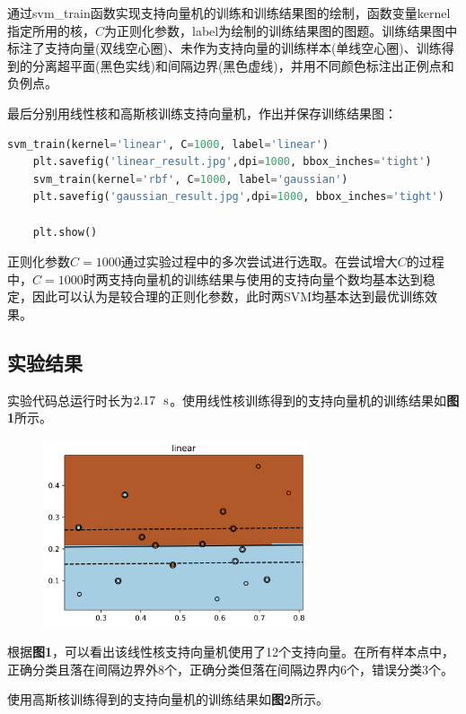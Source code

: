 \documentclass[12pt]{article}
\begin{document}
通过svm\_train函数实现支持向量机的训练和训练结果图的绘制，函数变量kernel指定所用的核，$C$为正则化参数，label为绘制的训练结果图的图题。训练结果图中标注了支持向量(双线空心圈)、未作为支持向量的训练样本(单线空心圈)、训练得到的分离超平面(黑色实线)和间隔边界(黑色虚线)，并用不同颜色标注出正例点和负例点。\par 
最后分别用线性核和高斯核训练支持向量机，作出并保存训练结果图：
\begin{lstlisting}[language=python]
	svm_train(kernel='linear', C=1000, label='linear')
	plt.savefig('linear_result.jpg',dpi=1000, bbox_inches='tight')
	svm_train(kernel='rbf', C=1000, label='gaussian')
	plt.savefig('gaussian_result.jpg',dpi=1000, bbox_inches='tight')
	
	plt.show()
\end{lstlisting}
正则化参数$C=1000$通过实验过程中的多次尝试进行选取。在尝试增大$C$的过程中，$C=1000$时两支持向量机的训练结果与使用的支持向量个数均基本达到稳定，因此可以认为是较合理的正则化参数，此时两SVM均基本达到最优训练效果。
\vbox{}

\subsection{实验结果}
实验代码总运行时长为$2.17\ \ {\rm s}$。使用线性核训练得到的支持向量机的训练结果如\textbf{图1}所示。
\begin{figure}[h]
	\centering
	\includegraphics[width=0.7\textwidth]{linear_result.jpg}
\end{figure}
\par 
根据\textbf{图1}，可以看出该线性核支持向量机使用了12个支持向量。在所有样本点中，正确分类且落在间隔边界外8个，正确分类但落在间隔边界内6个，错误分类3个。\par 


使用高斯核训练得到的支持向量机的训练结果如\textbf{图2}所示。
\end{document}
